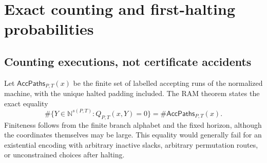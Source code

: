 \documentclass[11pt,a4paper]{article}
\theoremstyle{definition}
\theoremstyle{remark}
\newcommand{\N}{\mathbb N}
\newcommand{\srctag}[1]{\texorpdfstring{\hspace{0.5em}{\normalfont\small\color{accent}[#1]}}{ [#1]}}
\begin{document}
\section{Exact counting and first-halting probabilities\srctag{03}}\label{cdc:mem:sec:counting}
\subsection{Counting executions, not certificate accidents}
Let $\mathsf{AccPaths}_{P,T}(x)$ be the finite set of labelled accepting runs of
the normalized machine, with the unique halted padding included. The RAM
theorem states the exact equality
\begin{equation}\label{cdc:mem:eq:count}
 \#\{Y\in\N^{s(P,T)}:Q_{P,T}(x,Y)=0\}
 =\#\mathsf{AccPaths}_{P,T}(x).
\end{equation}
Finiteness follows from the finite branch alphabet and the fixed horizon,
although the coordinates themselves may be large. This equality would generally
fail for an existential encoding with arbitrary inactive slacks, arbitrary
permutation routes, or unconstrained choices after halting.
\end{document}
